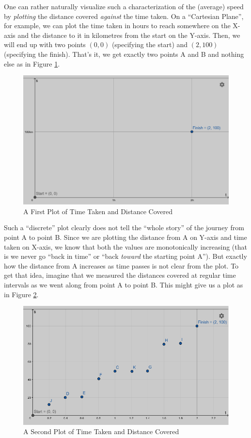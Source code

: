 \documentclass[12pt,a4paper]{book}
\begin{document}
\begin{enumerate}
\begin{enumerate}
                One can rather naturally visualize such a characterization of the (average) speed by \emph{plotting} the distance covered \emph{against} the time taken. On a ``Cartesian Plane'', for example, we can plot the time taken in hours to reach somewhere on the X-axis and the distance to it in kilometres from the start on the Y-axis. Then, we will end up with two points $(0, 0)$ (specifying the start) and $(2, 100)$ (specifying the finish). That's it, we get exactly two points A and B and nothing else as in Figure \ref{fig: a-first-s-t-plot}.
                        \begin{figure}[h!]
                            \centering
                            \includegraphics[width=0.5\linewidth]{a-first-s-t-plot.png}
                            \caption{A First Plot of Time Taken and Distance Covered}
                            \label{fig: a-first-s-t-plot}
                        \end{figure}

                Such a ``discrete'' plot clearly does not tell the ``whole story'' of the journey from point A to point B. Since we are plotting the distance from A on Y-axis and time taken on X-axis, we know that both the values are monotonically increasing (that is we never go ``back in time'' or ``back \emph{toward} the starting point A''). But exactly how the distance from A increases as time passes is not clear from the plot. To get that idea, imagine that we measured the distances covered at regular time intervals as we went along from point A to point B. This might give us a plot as in Figure \ref{fig: a-second-s-t-plot}.
                        \begin{figure}[h!]
                            \centering
                            \includegraphics[width=0.5\linewidth]{a-second-s-t-plot.png}
                            \caption{A Second Plot of Time Taken and Distance Covered}
                            \label{fig: a-second-s-t-plot}
                        \end{figure}

        \end{enumerate}

\end{enumerate}
\end{document}
